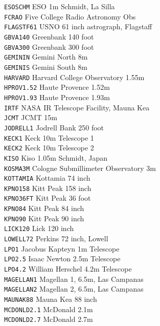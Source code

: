 \documentclass[11pt,fleqn,twoside]{article}
\renewcommand{\_}{{\tt\char'137}}     %
\begin{document}
{\begin{tabbing}
{\tt ESOSCHM} \> ESO 1m Schmidt, La Silla \\
{\tt FCRAO} \> Five College Radio Astronomy Obs \\
{\tt FLAGSTF61} \> USNO 61 inch astrograph, Flagstaff \\
{\tt GBVA140} \> Greenbank 140 foot \\
{\tt GBVA300} \> Greenbank 300 foot \\
{\tt GEMININ} \> Gemini North 8m \\
{\tt GEMINIS} \> Gemini South 8m \\
{\tt HARVARD} \> Harvard College Observatory 1.55m \\
{\tt HPROV1.52} \> Haute Provence 1.52m \\
{\tt HPROV1.93} \> Haute Provence 1.93m \\
{\tt IRTF} \> NASA IR Telescope Facility, Mauna Kea \\
{\tt JCMT} \> JCMT 15m \\
{\tt JODRELL1} \> Jodrell Bank 250 foot \\
{\tt KECK1} \> Keck 10m Telescope 1 \\
{\tt KECK2} \> Keck 10m Telescope 2 \\
{\tt KISO} \> Kiso 1.05m Schmidt, Japan \\
{\tt KOSMA3M} \> Cologne Submillimeter Observatory 3m \\
{\tt KOTTAMIA} \> Kottamia 74 inch \\
{\tt KPNO158} \> Kitt Peak 158 inch \\
{\tt KPNO36FT} \> Kitt Peak 36 foot \\
{\tt KPNO84} \> Kitt Peak 84 inch \\
{\tt KPNO90} \> Kitt Peak 90 inch \\
{\tt LICK120} \> Lick 120 inch \\
{\tt LOWELL72} \> Perkins 72 inch, Lowell \\
{\tt LPO1} \> Jacobus Kapteyn 1m Telescope \\
{\tt LPO2.5} \> Isaac Newton 2.5m Telescope \\
{\tt LPO4.2} \> William Herschel 4.2m Telescope \\
{\tt MAGELLAN1} \> Magellan 1, 6.5m, Las Campanas \\
{\tt MAGELLAN2} \> Magellan 2, 6.5m, Las Campanas \\
{\tt MAUNAK88} \> Mauna Kea 88 inch \\
{\tt MCDONLD2.1} \> McDonald 2.1m \\
{\tt MCDONLD2.7} \> McDonald 2.7m \\

\end{tabbing}}
\end{document}
